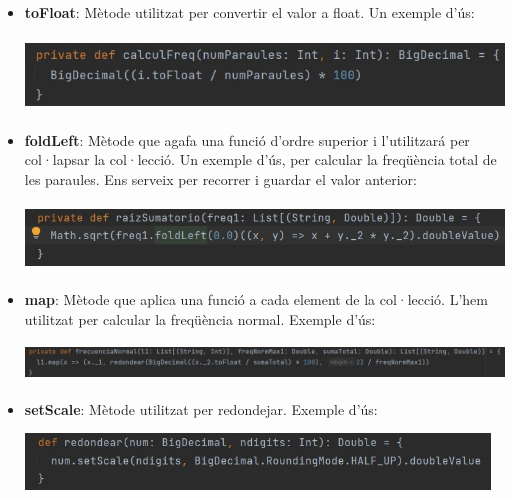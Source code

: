 \documentclass[11pt,a4paper]{article}
\begin{document}
		\begin{itemize}
			\item \textbf{toFloat}: Mètode utilitzat per convertir el valor a float. Un exemple d'ús:
				\begin{center}
					\includegraphics[height=2cm]{captures/primeraPart/ordreSuperior/toFloat.jpg}
				\end{center}
				
			\item \textbf{foldLeft}: Mètode que agafa una funció d'ordre superior i l'utilitzará per col·lapsar la col·lecció. Un exemple d'ús, per calcular la freqüència total de les paraules. Ens serveix per recorrer i guardar el valor anterior:
				\begin{center}
					\includegraphics[height=1.8cm]{captures/primeraPart/ordreSuperior/foldLeft.jpg}
				\end{center}
				
			\item \textbf{map}: Mètode que aplica una funció a cada element de la col·lecció. L'hem utilitzat per calcular la freqüència normal. Exemple d'ús:
				\begin{center}
					\includegraphics[height=1cm]{captures/primeraPart/ordreSuperior/map.jpg}
				\end{center}
				
			\item \textbf{setScale}: Mètode utilitzat per redondejar. Exemple d'ús:
				\begin{center}
					\includegraphics[height=1.5cm]{captures/primeraPart/ordreSuperior/setScale.jpg}
				\end{center}
				

\end{itemize}
\end{document}
